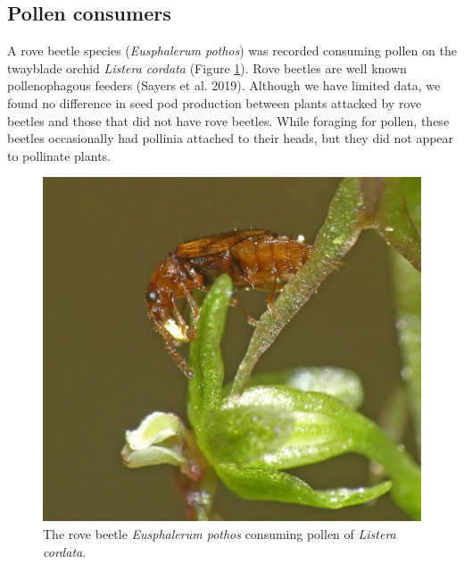 \begin{multicols}{2} 



\subsection{Pollen consumers}

A rove beetle species (\emph{Eusphalerum pothos}) was recorded consuming
pollen on the twayblade orchid \emph{Listera cordata} (Figure \ref{Listera_cordata_Eusphalerum_pothos}). Rove
beetles are well known pollenophagous feeders (Sayers et al. 2019).
Although we have limited data, we found no difference in seed pod
production between plants attacked by rove beetles and those that did
not have rove beetles. While foraging for pollen, these beetles
occasionally had pollinia attached to their heads, but they did not
appear to pollinate plants.

\begin{figure}[H]
\begin{center}
\vspace{2mm}
\includegraphics[width=\textwidth]{img/Listera_cordata_Eusphalerum_pothos.jpg}
\caption{The rove beetle \emph{Eusphalerum pothos} consuming pollen of \emph{Listera cordata}.}
\label{Listera_cordata_Eusphalerum_pothos}
\end{center}
\end{figure}





\end{multicols}
